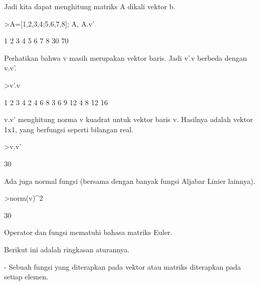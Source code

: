\documentclass[a4paper,10pt]{article}
\begin{document}
\begin{eulernotebook}
\begin{euleroutput}
\end{euleroutput}
\begin{eulercomment}
Jadi kita dapat menghitung matriks A dikali vektor b.
\end{eulercomment}
\begin{eulerprompt}
>A=[1,2,3,4;5,6,7,8]; A, A.v'
\end{eulerprompt}
\begin{euleroutput}
              1             2             3             4 
              5             6             7             8 
             30 
             70 
\end{euleroutput}
\begin{eulercomment}
Perhatikan bahwa v masih merupakan vektor baris. Jadi v'.v berbeda
dengan v.v'.
\end{eulercomment}
\begin{eulerprompt}
>v'.v
\end{eulerprompt}
\begin{euleroutput}
              1             2             3             4 
              2             4             6             8 
              3             6             9            12 
              4             8            12            16 
\end{euleroutput}
\begin{eulercomment}
v.v' menghitung norma v kuadrat untuk vektor baris v. Hasilnya adalah
vektor 1x1, yang berfungsi seperti bilangan real.
\end{eulercomment}
\begin{eulerprompt}
>v.v'
\end{eulerprompt}
\begin{euleroutput}
  30
\end{euleroutput}
\begin{eulercomment}
Ada juga normal fungsi (bersama dengan banyak fungsi Aljabar Linier
lainnya).
\end{eulercomment}
\begin{eulerprompt}
>norm(v)^2
\end{eulerprompt}
\begin{euleroutput}
  30
\end{euleroutput}
\begin{eulercomment}
Operator dan fungsi mematuhi bahasa matriks Euler.

Berikut ini adalah ringkasan aturannya.

- Sebuah fungsi yang diterapkan pada vektor atau matriks diterapkan
pada setiap elemen.


\end{eulercomment}
\end{eulernotebook}
\end{document}
